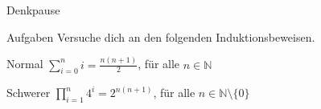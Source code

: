 {
\begin{frame}[fragile]{Denkpause}
    \begin{alertblock}{Aufgaben}
    Versuche dich an den folgenden Induktionsbeweisen.
    \end{alertblock}

    \begin{block}{Normal}
        $\displaystyle\sum_{i=0}^{n} i = \frac{n(n+1)}{2}$, für alle $n \in \mathbb{N}$
    \end{block}
    \begin{block}{Schwerer}
        $\displaystyle\prod_{i=1}^{n} 4^i = 2^{n(n+1)}$, für alle $n \in \mathbb{N}\setminus \{0\}$
    \end{block}
\end{frame}
}

